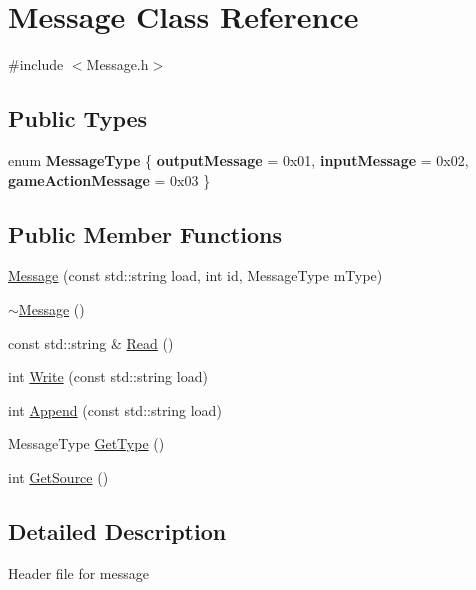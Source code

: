 \hypertarget{class_message}{}\section{Message Class Reference}
\label{class_message}


{\ttfamily \#include $<$Message.\+h$>$}

\subsection*{Public Types}
\begin{DoxyCompactItemize}
\item 
\hypertarget{class_message_af4370c64206db0d5b0a3b7f8d3bbfc31}{}enum {\bfseries Message\+Type} \{ {\bfseries output\+Message} = 0x01, 
{\bfseries input\+Message} = 0x02, 
{\bfseries game\+Action\+Message} = 0x03
 \}\label{class_message_af4370c64206db0d5b0a3b7f8d3bbfc31}

\end{DoxyCompactItemize}
\subsection*{Public Member Functions}
\begin{DoxyCompactItemize}
\item 
\hyperlink{class_message_a3af4af638e94512f9a54eaf2638af46e}{Message} (const std\+::string load, int id, Message\+Type m\+Type)
\item 
\hyperlink{class_message_a3f7275462831f787a861271687bcad67}{$\sim$\+Message} ()
\item 
const std\+::string \& \hyperlink{class_message_a739b4aaa722ec1491b61c938d40faf6a}{Read} ()
\item 
int \hyperlink{class_message_af4d9dc3589639d8e0612d2077823883a}{Write} (const std\+::string load)
\item 
int \hyperlink{class_message_a62cbff053193fdb05ac7492623a206b3}{Append} (const std\+::string load)
\item 
Message\+Type \hyperlink{class_message_a5b6472c4ac06222f8a71e6622ff4d8f1}{Get\+Type} ()
\item 
int \hyperlink{class_message_a1fb677cce4e09b890eb06403c8afd757}{Get\+Source} ()
\end{DoxyCompactItemize}


\subsection{Detailed Description}
Header file for message 

